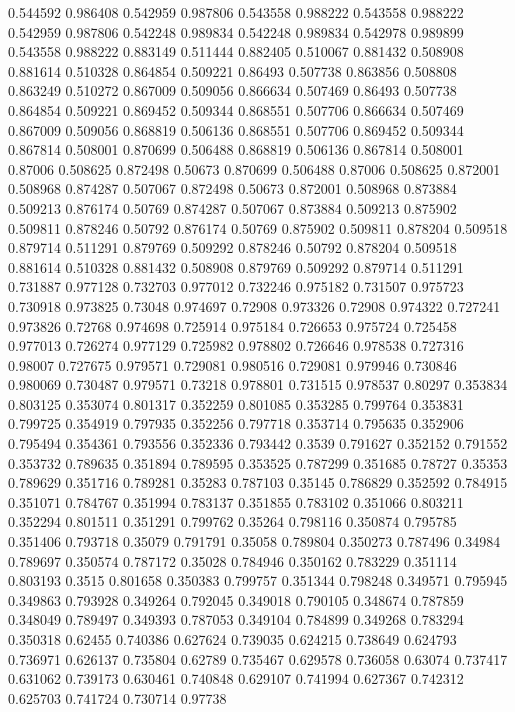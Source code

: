 0.544592 0.986408
0.542959 0.987806
0.543558 0.988222
0.543558 0.988222
0.542959 0.987806
0.542248 0.989834
0.542248 0.989834
0.542978 0.989899
0.543558 0.988222
0.883149 0.511444
0.882405 0.510067
0.881432 0.508908
0.881614 0.510328
0.864854 0.509221
0.86493 0.507738
0.863856 0.508808
0.863249 0.510272
0.867009 0.509056
0.866634 0.507469
0.86493 0.507738
0.864854 0.509221
0.869452 0.509344
0.868551 0.507706
0.866634 0.507469
0.867009 0.509056
0.868819 0.506136
0.868551 0.507706
0.869452 0.509344
0.867814 0.508001
0.870699 0.506488
0.868819 0.506136
0.867814 0.508001
0.87006 0.508625
0.872498 0.50673
0.870699 0.506488
0.87006 0.508625
0.872001 0.508968
0.874287 0.507067
0.872498 0.50673
0.872001 0.508968
0.873884 0.509213
0.876174 0.50769
0.874287 0.507067
0.873884 0.509213
0.875902 0.509811
0.878246 0.50792
0.876174 0.50769
0.875902 0.509811
0.878204 0.509518
0.879714 0.511291
0.879769 0.509292
0.878246 0.50792
0.878204 0.509518
0.881614 0.510328
0.881432 0.508908
0.879769 0.509292
0.879714 0.511291
0.731887 0.977128
0.732703 0.977012
0.732246 0.975182
0.731507 0.975723
0.730918 0.973825
0.73048 0.974697
0.72908 0.973326
0.72908 0.974322
0.727241 0.973826
0.72768 0.974698
0.725914 0.975184
0.726653 0.975724
0.725458 0.977013
0.726274 0.977129
0.725982 0.978802
0.726646 0.978538
0.727316 0.98007
0.727675 0.979571
0.729081 0.980516
0.729081 0.979946
0.730846 0.980069
0.730487 0.979571
0.73218 0.978801
0.731515 0.978537
0.80297 0.353834
0.803125 0.353074
0.801317 0.352259
0.801085 0.353285
0.799764 0.353831
0.799725 0.354919
0.797935 0.352256
0.797718 0.353714
0.795635 0.352906
0.795494 0.354361
0.793556 0.352336
0.793442 0.3539
0.791627 0.352152
0.791552 0.353732
0.789635 0.351894
0.789595 0.353525
0.787299 0.351685
0.78727 0.35353
0.789629 0.351716
0.789281 0.35283
0.787103 0.35145
0.786829 0.352592
0.784915 0.351071
0.784767 0.351994
0.783137 0.351855
0.783102 0.351066
0.803211 0.352294
0.801511 0.351291
0.799762 0.35264
0.798116 0.350874
0.795785 0.351406
0.793718 0.35079
0.791791 0.35058
0.789804 0.350273
0.787496 0.34984
0.789697 0.350574
0.787172 0.35028
0.784946 0.350162
0.783229 0.351114
0.803193 0.3515
0.801658 0.350383
0.799757 0.351344
0.798248 0.349571
0.795945 0.349863
0.793928 0.349264
0.792045 0.349018
0.790105 0.348674
0.787859 0.348049
0.789497 0.349393
0.787053 0.349104
0.784899 0.349268
0.783294 0.350318
0.62455 0.740386
0.627624 0.739035
0.624215 0.738649
0.624793 0.736971
0.626137 0.735804
0.62789 0.735467
0.629578 0.736058
0.63074 0.737417
0.631062 0.739173
0.630461 0.740848
0.629107 0.741994
0.627367 0.742312
0.625703 0.741724
0.730714 0.97738
